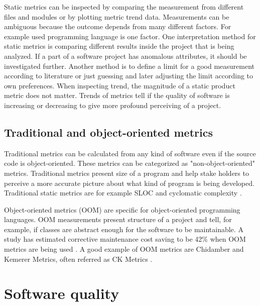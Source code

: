 Static metrics can be inspected by comparing the measurement from different files and modules or by plotting metric trend data. Measurements can be ambiguous because the outcome depends from many different factors. For example used programming language is one factor. One interpretation method for static metrics is comparing different results inside the project that is being analyzed. If a part of a software project has anomalous attributes, it should be investigated further. Another method is to define a limit for a good measurement according to literature or just guessing and later adjusting the limit according to own preferences.
When inspecting trend, the magnitude of a static product metric does not matter. Trends of metrics tell if the quality of software is increasing or decreasing to give more profound perceiving of a project.

\subsection{Traditional and object-oriented metrics}

Traditional metrics can be calculated from any kind of software even if the source code is object-oriented. These metrics can be categorized as "non-object-oriented" metrics. Traditional metrics present size of a program and help stake holders to perceive a more accurate picture about what kind of program is being developed. Traditional static metrics are for example SLOC and cyclomatic complexity \cite{fenton1997software}.  

Object-oriented metrics (OOM) are specific for object-oriented programming languages. OOM measurements present structure of a project and tell, for example, if classes are abstract enough for the software to be maintainable. A study has estimated corrective maintenance cost saving to be 42\% when OOM metrics are being used \cite{sarker2005overview}. A good example of OOM metrics are Chidamber and Kemerer Metrics, often referred as CK Metrics \cite{chidamber1994metrics}.

\section{Software quality}
\label{chap:quality}

